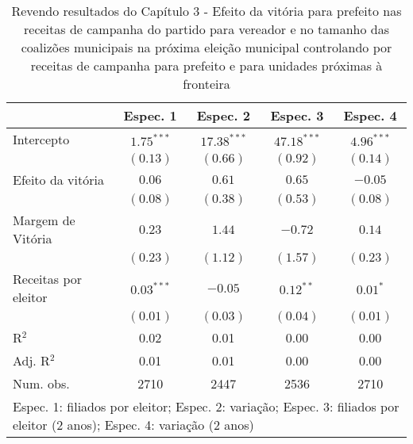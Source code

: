 
\begin{table}
\caption{Revendo resultados do Capítulo 3 - Efeito da vitória para prefeito nas receitas de campanha do partido para vereador e no tamanho das coalizões municipais na próxima eleição municipal controlando por receitas de campanha para prefeito e para unidades próximas à fronteira}
\begin{center}
\begin{tabular}{l c c c c }
\hline
                     & Espec. 1 & Espec. 2 & Espec. 3 & Espec. 4 \\
\hline
Intercepto           & $1.75^{***}$ & $17.38^{***}$ & $47.18^{***}$ & $4.96^{***}$ \\
                     & $(0.13)$     & $(0.66)$      & $(0.92)$      & $(0.14)$     \\
Efeito da vitória    & $0.06$       & $0.61$        & $0.65$        & $-0.05$      \\
                     & $(0.08)$     & $(0.38)$      & $(0.53)$      & $(0.08)$     \\
Margem de Vitória    & $0.23$       & $1.44$        & $-0.72$       & $0.14$       \\
                     & $(0.23)$     & $(1.12)$      & $(1.57)$      & $(0.23)$     \\
Receitas por eleitor & $0.03^{***}$ & $-0.05$       & $0.12^{**}$   & $0.01^{*}$   \\
                     & $(0.01)$     & $(0.03)$      & $(0.04)$      & $(0.01)$     \\
\hline
R$^2$                & 0.02         & 0.01          & 0.00          & 0.00         \\
Adj. R$^2$           & 0.01         & 0.01          & 0.00          & 0.00         \\
Num. obs.            & 2710         & 2447          & 2536          & 2710         \\
\hline
\multicolumn{5}{l}{\scriptsize{Espec. 1: filiados por eleitor; Espec. 2: variação; Espec. 3: filiados por eleitor (2 anos); Espec. 4: variação (2 anos)}}
\end{tabular}
\label{tab:c4t9}
\end{center}
\end{table}

